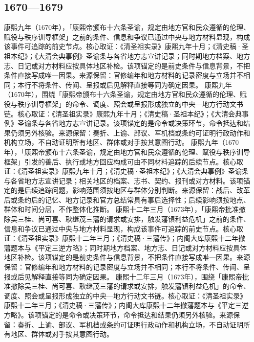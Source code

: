\subsection{1670—1679}
康熙九年（1670年），「康熙帝颁布十六条圣谕，规定由地方官和民众遵循的伦理、赋役与秩序训导框架」之前的条件、信息和争议已通过中央与地方材料显现，构成该事件可追踪的前史节点。核心取证：《清圣祖实录》康熙九年十月；《清史稿·圣祖本纪》；《大清会典事例》圣谕条与各省地方志宣讲记录；同时期地方档案、地方志、日记或对方材料应按具体地区补检。该项锚定的是前史条件与信息背景，不把条件直接写成唯一因果。来源保留：官修编年和地方材料的记录密度与立场并不相同；本行不将条件、传闻、呈报或后见解释直接等同为确定因果。
康熙九年（1670年），围绕「康熙帝颁布十六条圣谕，规定由地方官和民众遵循的伦理、赋役与秩序训导框架」的命令、调度、照会或呈报形成独立的中央—地方行动文书链。核心取证：《清圣祖实录》康熙九年十月；《清史稿·圣祖本纪》；《大清会典事例》圣谕条与各省地方志宣讲记录。该项锚定的是命令或决策环节，命令抵达和结果仍须另外核验。来源保留：奏折、上谕、部议、军机档或条约可证明行政动作和机构立场，不自动证明所有地区、群体或对手按其意图行动。
康熙九年（1670年），「康熙帝颁布十六条圣谕，规定由地方官和民众遵循的伦理、赋役与秩序训导框架」引发的善后、执行或地方回应构成可由不同材料追踪的后续节点。核心取证：《清圣祖实录》康熙九年十月；《清史稿·圣祖本纪》；《大清会典事例》圣谕条与各省地方志宣讲记录；相关地区的档案、志书、契约、报刊或对方材料。该项锚定的是后续追踪问题，影响范围须按地区与群体分别判断。来源保留：战后、改革后或条约后的记忆、地方记录和官方总结常具有事后选择性；后续影响须按地点、群体和时间分层，不作整体化推断。
康熙十二年三月（1673年），「康熙帝批准撤除吴三桂、尚可喜、耿继茂三藩的请求或安排，触发藩镇利益危机」之前的条件、信息和争议已通过中央与地方材料显现，构成该事件可追踪的前史节点。核心取证：《清圣祖实录》康熙十二年三月；《清史稿·三藩传》；内阁大库康熙十二年撤藩题本与《平定三逆方略》；同时期地方档案、地方志、日记或对方材料应按具体地区补检。该项锚定的是前史条件与信息背景，不把条件直接写成唯一因果。来源保留：官修编年和地方材料的记录密度与立场并不相同；本行不将条件、传闻、呈报或后见解释直接等同为确定因果。
康熙十二年三月（1673年），围绕「康熙帝批准撤除吴三桂、尚可喜、耿继茂三藩的请求或安排，触发藩镇利益危机」的命令、调度、照会或呈报形成独立的中央—地方行动文书链。核心取证：《清圣祖实录》康熙十二年三月；《清史稿·三藩传》；内阁大库康熙十二年撤藩题本与《平定三逆方略》。该项锚定的是命令或决策环节，命令抵达和结果仍须另外核验。来源保留：奏折、上谕、部议、军机档或条约可证明行政动作和机构立场，不自动证明所有地区、群体或对手按其意图行动。
